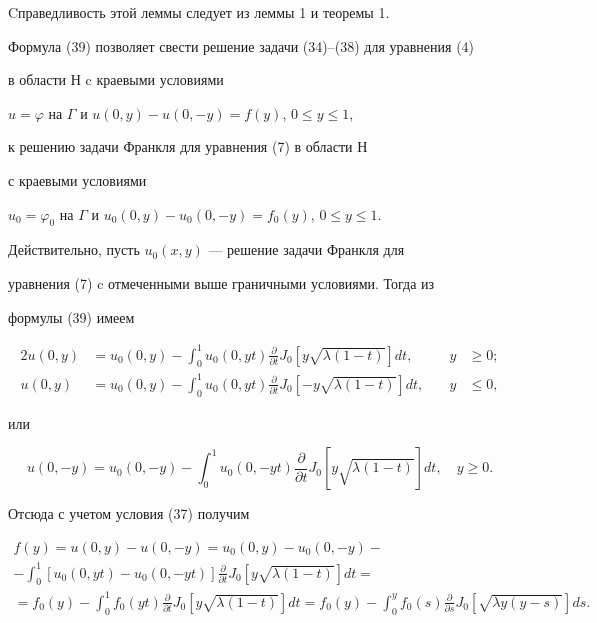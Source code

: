 Cправедливость этой леммы следует из леммы 1 и теоремы 1.





Формула (39) позволяет свести решение задачи (34)--(38) для уравнения (4)


в области $Н$ c краевыми условиями


$u=\varphi$ на $\Gamma$ и $u(0,y)-u(0,-y)=f(y)$, $0\le y\le 1$,


к решению задачи Франкля для уравнения (7) в области $Н$


с краевыми условиями


$u_0=\varphi_0$ на $\Gamma$ и $u_0(0,y)-u_0(0,-y)=f_0(y)$, $0\le y\le 1$.





Действительно, пусть $u_0(x,y)$ --- решение задачи Франкля для


уравнения (7) c отмеченными выше граничными условиями. Тогда из


формулы (39) имеем


\begin{alignat*}{2}


u(0,y)&=u_0(0,y)-\int_0^1 u_0(0,yt)\frac {\partial }


{\partial t}J_0[y\sqrt {\lambda (1-t)}]dt, &\quad y&\ge 0;\\


%


u(0,y)&=u_0(0,y)-\int_0^1 u_0(0,yt)\frac {\partial }


{\partial t}J_0[-y\sqrt {\lambda (1-t)}]dt, &\quad y&\le 0,


\end{alignat*}


или


$$


u(0,-y)=u_0(0,-y)-\int_0^1 u_0(0,-yt)\frac {\partial }


{\partial t}J_0[y\sqrt {\lambda (1-t)}]dt,\quad y\ge 0.


$$


Отсюда с учетом условия (37) получим


\begin{multline*}


f(y)=u(0,y)-u(0,-y)=u_0(0,y)-u_0(0,-y)- \\


%


-\int_0^1 [u_0(0,yt)-u_0(0,-yt)]\frac {\partial }


{\partial t}J_0[y\sqrt {\lambda (1-t)}]dt= \\


%


=f_0(y)-\int_0^1 f_0(yt)\frac {\partial }


{\partial t}J_0[y\sqrt {\lambda (1-t)}]dt=


f_0(y)-\int _0^y f_0(s)\frac {\partial }


{\partial s}J_0[\sqrt {\lambda y(y-s)}]ds.


\end{multline*}


